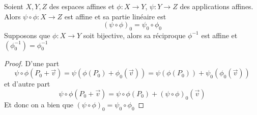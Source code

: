 \begin{proposition}
	Soient $X, Y, Z$ des espaces affines et $\phi: X \to Y$, 
	$\psi: Y \to Z$ des applications affines. Alors
	$\psi \circ \phi : X \to Z$ est affine et sa partie linéaire est
	\begin{equation*}
		(\psi \circ \phi)_0 = \psi_0 \circ \phi_0
	\end{equation*}
	Supposons que $\phi: X \to Y$ soit bijective, alors sa réciproque $\phi^{-1}$
	est affine et $(\phi^{-1}_0) = \phi_0^{-1}$
\end{proposition}

\begin{proof}
	D'une part
	\begin{equation*}
		\psi \circ \phi (P_0 + \vec{v}) = \psi(\phi(P_0) + \phi_0(\vec{v}))
		= \psi(\phi(P_0)) + \psi_0(\phi_0(\vec{v}))
	\end{equation*}
	et d'autre part 
	\begin{equation*}
		\psi \circ \phi (P_0 + \vec{v})
		= \psi \circ \phi(P_0) + (\psi \circ \phi)_0(\vec{v})
	\end{equation*}
	Et donc on a bien que $(\psi \circ \phi)_0 = \psi_0 \circ \phi_0$ 
\end{proof}

